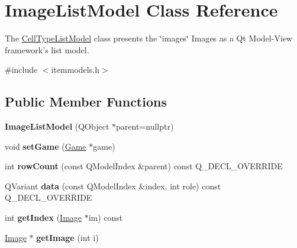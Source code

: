 \hypertarget{class_image_list_model}{\section{\-Image\-List\-Model \-Class \-Reference}
\label{class_image_list_model}
}


\-The \hyperlink{class_cell_type_list_model}{\-Cell\-Type\-List\-Model} class presents the \char`\"{}images\char`\"{} \-Images as a \-Qt \-Model-\/\-View framework's list model.  




{\ttfamily \#include $<$itemmodels.\-h$>$}

\subsection*{\-Public \-Member \-Functions}
\begin{DoxyCompactItemize}
\item 
\hypertarget{class_image_list_model_aabcbc09dc395b721045f92d937aa983c}{{\bfseries \-Image\-List\-Model} (\-Q\-Object $\ast$parent=nullptr)}\label{class_image_list_model_aabcbc09dc395b721045f92d937aa983c}

\item 
\hypertarget{class_image_list_model_a5d080c3a38209707e74b8bce8aaa82c7}{void {\bfseries set\-Game} (\hyperlink{class_game}{\-Game} $\ast$game)}\label{class_image_list_model_a5d080c3a38209707e74b8bce8aaa82c7}

\item 
\hypertarget{class_image_list_model_a0551fc4383296d80da4674c695871c9e}{int {\bfseries row\-Count} (const \-Q\-Model\-Index \&parent) const \-Q\-\_\-\-D\-E\-C\-L\-\_\-\-O\-V\-E\-R\-R\-I\-D\-E}\label{class_image_list_model_a0551fc4383296d80da4674c695871c9e}

\item 
\hypertarget{class_image_list_model_ae9d85325be9f2ceeebc509536956eb64}{\-Q\-Variant {\bfseries data} (const \-Q\-Model\-Index \&index, int role) const \-Q\-\_\-\-D\-E\-C\-L\-\_\-\-O\-V\-E\-R\-R\-I\-D\-E}\label{class_image_list_model_ae9d85325be9f2ceeebc509536956eb64}

\item 
\hypertarget{class_image_list_model_af7c1a4f01acefff9da798940e24309e7}{int {\bfseries get\-Index} (\hyperlink{class_image}{\-Image} $\ast$im) const }\label{class_image_list_model_af7c1a4f01acefff9da798940e24309e7}

\item 
\hypertarget{class_image_list_model_aef433b2f06ca2ce2761c487a2f0afd4c}{\hyperlink{class_image}{\-Image} $\ast$ {\bfseries get\-Image} (int i)}\label{class_image_list_model_aef433b2f06ca2ce2761c487a2f0afd4c}

\end{DoxyCompactItemize}



